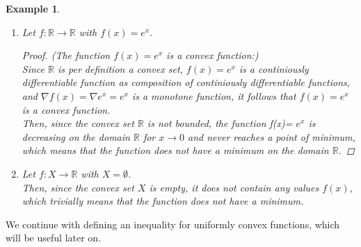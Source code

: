 \documentclass[a4paper, 11pt]{report}
\theoremstyle{break}
\newtheorem{example}[definition]{Example}
\theoremstyle{proofstyle}
\newtheorem{proof}{Proof}
\newcommand{\R}{\mathbb{R}}
\begin{document}
\begin{example} \label{example:5}
	\begin{enumerate}[label=(\arabic*)]
		\item Let $f:\R\rightarrow\R$ with $f(x)=e^x$.
		\begin{proof} (The function \(f(x)=e^x\) is a convex function:) \\
			Since $\R$ is per definition a convex set, $f(x)=e^x$ is a continiously differentiable function as composition of continiously differentiable functions, and $\nabla{f(x)} = \nabla e^x = e^x$ is a monotone function, it follows that $f(x)=e^x$ is a convex function. \\
			Then, since the convex set $\R$ is not bounded, the function f(x)= $e^x$ is decreasing on the domain $\R$ for $x \rightarrow 0$ and never reaches a point of minimum, which means that the function does not have a minimum on the domain $\R$. %
		\end{proof}
		\item Let $f:X\rightarrow\R$  with $X=\emptyset$. \\
		Then, since the convex set $X$ is empty, it does not contain any values $f(x)$, which trivially means that the function does not have a minimum.
	\end{enumerate}

\begin{center}
\end{center}

\end{example}

We continue with defining an inequality for uniformly convex functions, which will be useful later on.
\end{document}
